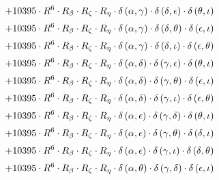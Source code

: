 \begin{subequations}
\begin{gather}
 \\[0.2em] \notag 		 + 10395 \cdot R^{6} \cdot R_{\beta{}} \cdot R_{\zeta{}} \cdot R_{\eta{}} \cdot \delta{}\left(\alpha{}, \gamma{}\right) \cdot \delta{}\left(\delta{}, \epsilon{}\right) \cdot \delta{}\left(\theta{}, \iota{}\right) 
 \\[0.2em] \notag 		 + 10395 \cdot R^{6} \cdot R_{\beta{}} \cdot R_{\zeta{}} \cdot R_{\eta{}} \cdot \delta{}\left(\alpha{}, \gamma{}\right) \cdot \delta{}\left(\delta{}, \theta{}\right) \cdot \delta{}\left(\epsilon{}, \iota{}\right) 
 \\[0.2em] \notag 		 + 10395 \cdot R^{6} \cdot R_{\beta{}} \cdot R_{\zeta{}} \cdot R_{\eta{}} \cdot \delta{}\left(\alpha{}, \gamma{}\right) \cdot \delta{}\left(\delta{}, \iota{}\right) \cdot \delta{}\left(\epsilon{}, \theta{}\right) 
 \\[0.2em] \notag 		 + 10395 \cdot R^{6} \cdot R_{\beta{}} \cdot R_{\zeta{}} \cdot R_{\eta{}} \cdot \delta{}\left(\alpha{}, \delta{}\right) \cdot \delta{}\left(\gamma{}, \epsilon{}\right) \cdot \delta{}\left(\theta{}, \iota{}\right) 
 \\[0.2em] \notag 		 + 10395 \cdot R^{6} \cdot R_{\beta{}} \cdot R_{\zeta{}} \cdot R_{\eta{}} \cdot \delta{}\left(\alpha{}, \delta{}\right) \cdot \delta{}\left(\gamma{}, \theta{}\right) \cdot \delta{}\left(\epsilon{}, \iota{}\right) 
 \\[0.2em] \notag 		 + 10395 \cdot R^{6} \cdot R_{\beta{}} \cdot R_{\zeta{}} \cdot R_{\eta{}} \cdot \delta{}\left(\alpha{}, \delta{}\right) \cdot \delta{}\left(\gamma{}, \iota{}\right) \cdot \delta{}\left(\epsilon{}, \theta{}\right) 
 \\[0.2em] \notag 		 + 10395 \cdot R^{6} \cdot R_{\beta{}} \cdot R_{\zeta{}} \cdot R_{\eta{}} \cdot \delta{}\left(\alpha{}, \epsilon{}\right) \cdot \delta{}\left(\gamma{}, \delta{}\right) \cdot \delta{}\left(\theta{}, \iota{}\right) 
 \\[0.2em] \notag 		 + 10395 \cdot R^{6} \cdot R_{\beta{}} \cdot R_{\zeta{}} \cdot R_{\eta{}} \cdot \delta{}\left(\alpha{}, \epsilon{}\right) \cdot \delta{}\left(\gamma{}, \theta{}\right) \cdot \delta{}\left(\delta{}, \iota{}\right) 
 \\[0.2em] \notag 		 + 10395 \cdot R^{6} \cdot R_{\beta{}} \cdot R_{\zeta{}} \cdot R_{\eta{}} \cdot \delta{}\left(\alpha{}, \epsilon{}\right) \cdot \delta{}\left(\gamma{}, \iota{}\right) \cdot \delta{}\left(\delta{}, \theta{}\right) 
 \\[0.2em] \notag 		 + 10395 \cdot R^{6} \cdot R_{\beta{}} \cdot R_{\zeta{}} \cdot R_{\eta{}} \cdot \delta{}\left(\alpha{}, \theta{}\right) \cdot \delta{}\left(\gamma{}, \delta{}\right) \cdot \delta{}\left(\epsilon{}, \iota{}\right) 

\end{gather}
\end{subequations}
